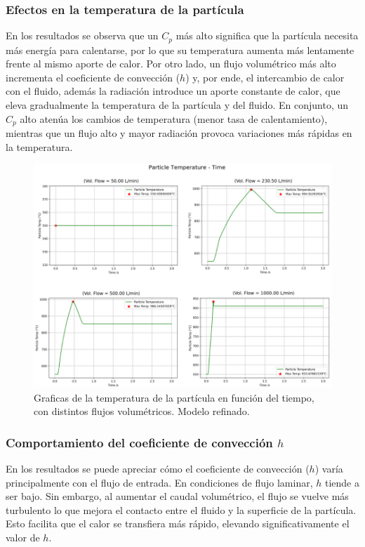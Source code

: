 \documentclass[11pt,stdletter,orderfromtodate,sigleft,twoside]{report}
\begin{document}
\subsubsection{Efectos en la temperatura de la partícula}

En los resultados se observa que un $C_p$ más alto significa que la partícula necesita más energía para calentarse, por lo que su temperatura aumenta más lentamente frente al mismo aporte de calor. Por otro lado, un flujo volumétrico más alto incrementa el coeficiente de convección ($h$) y, por ende, el intercambio de calor con el fluido, además la radiación introduce un aporte constante de calor, que eleva gradualmente la temperatura de la partícula y del fluido. En conjunto, un $C_p$ alto atenúa los cambios de temperatura (menor tasa de calentamiento), mientras que un flujo alto y mayor radiación provoca variaciones más rápidas en la temperatura.

\begin{figure}[H]
    \centering
    \includegraphics[width=0.7\linewidth]{figures/Radcte2.png}
    \caption{Graficas de la temperatura de la partícula en función del tiempo, con distintos flujos volumétricos. Modelo refinado.}
    \label{fig:enter-label}
\end{figure}

\subsubsection{Comportamiento del coeficiente de convección $h$}

En los resultados se puede apreciar cómo el coeficiente de convección ($h$) varía principalmente con el flujo de entrada. En condiciones de flujo laminar, $h$ tiende a ser bajo. Sin embargo, al aumentar el caudal volumétrico, el flujo se vuelve más turbulento lo que mejora el contacto entre el fluido y la superficie de la partícula. Esto facilita que el calor se transfiera más rápido, elevando significativamente el valor de $h$.
\end{document}
